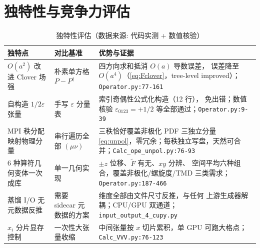 \documentclass[UTF8]{ctexart}
\begin{document}
\section{独特性与竞争力评估}
\begin{table}[htbp]\centering
\begin{tabularx}{\textwidth}{lXX}
\toprule
\textcolor{algo}{独特点} & 对比基准 & 优势与证据 \\
\midrule
$O(a^2)$ 改进 Clover 场强 & 朴素单方格 $P-P^\dagger$ & 四方向求和抵消 $O(a)$ 导数误差，
  误差降至 $O(a^4)$（\eqref{eq:Fclover}，tree-level improved）；\texttt{\nolinkurl{Operator.py:77-161}} \\
自构造 $1/2\varepsilon$ 张量 & 手写 $\varepsilon$ 分量表 & 索引奇偶性公式化构造（12 行），
  免出错；数值核验 $\varepsilon_{0123}=+1/2$ 等全部通过；\texttt{\nolinkurl{Operator.py:9-39}} \\
MPI 秩分配映射物理分量 & 串行遍历全部 $(\mu\nu)$ & 三秩恰好覆盖非极化 PDF 三独立分量
  \eqref{eq:unpol}，零冗余；每秩独立写盘，天然可合并；\texttt{\nolinkurl{Calc_ope_unpol.py:76-93}} \\
6 种算符几何变体一次成库 & 单一几何实现 & $\pm z$ 位移、$\widetilde F$ 有无、$xy$ 分辨、
  空间平均六种组合，覆盖非极化/螺旋度/TMD 三类需求；\texttt{\nolinkurl{Operator.py:187-466}} \\
蒸馏 I/O 无元数据反推 & 需要 sidecar 元数据的方案 & 维度全部由文件尺寸反推，与任何
  上游生成器解耦；CPU/GPU 双通道；\texttt{\nolinkurl{input_output_4_cupy.py}} \\
$x_i$ 分片显存控制 & 一次性大张量收缩 & 中间张量按 $x$ 切片累积，单 GPU 可跑大格点；
  \texttt{\nolinkurl{Calc_VVV.py:76-123}} \\
\bottomrule
\end{tabularx}
\caption{独特性评估（数据来源: 代码实测 + 数值核验）}
\end{table}

\end{document}

